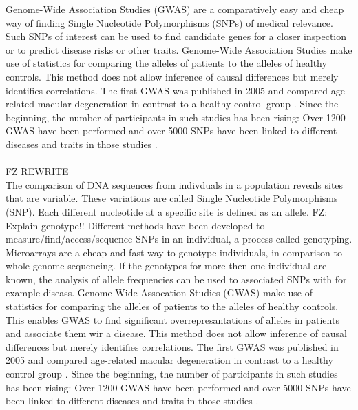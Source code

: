\documentclass[10pt]{article}
\begin{document}
Genome-Wide Association Studies (GWAS) are a comparatively easy and cheap way of finding Single Nucleotide Polymorphisms (SNPs) of medical relevance. Such SNPs of interest can be used to find candidate genes for a closer inspection or to predict disease risks or other traits. Genome-Wide Association Studies make use of statistics for comparing the alleles of patients to the alleles of healthy controls. This method does not allow inference of causal differences but merely identifies correlations. The first GWAS was published in 2005 and compared age-related macular degeneration in contrast to a healthy control group \cite{Klein2005}. Since the beginning, the number of participants in such studies has been rising: Over 1200 GWAS have been performed \cite{Johnson2009} and over 5000 SNPs have been linked to different diseases and traits in those studies \cite{Hindorff2009}. %
\\
\\
FZ REWRITE 
\\
The comparison of DNA sequences from indivduals in a population reveals sites that are variable. 
These variations are called Single Nucleotide Polymorphisms (SNP). Each different nucleotide 
at a specific site is defined as an allele. FZ: Explain genotype!!
Different methods have been developed to measure/find/access/sequence SNPs in an individual, a
process called genotyping. Microarrays are a cheap and fast way to genotype individuals, in comparison
to whole genome sequencing. If the genotypes for more then one individual are known, the analysis of
allele frequencies can be used to associated SNPs with for example diseass. Genome-Wide Assocation Studies
(GWAS) make use of statistics for comparing the alleles of patients to the alleles of healthy controls. This
enables GWAS to find significant overrepresantations of alleles in patients and associate them wir a disease.
This method does not allow inference of causal differences but merely identifies correlations. 
The first GWAS was published in 2005 and compared age-related macular degeneration in contrast 
to a healthy control group \cite{Klein2005}. Since the beginning, the number of participants in 
such studies has been rising: Over 1200 GWAS have been performed \cite{Johnson2009} and over 
5000 SNPs have been linked to different diseases and traits in those studies \cite{Hindorff2009}. 
\end{document}
